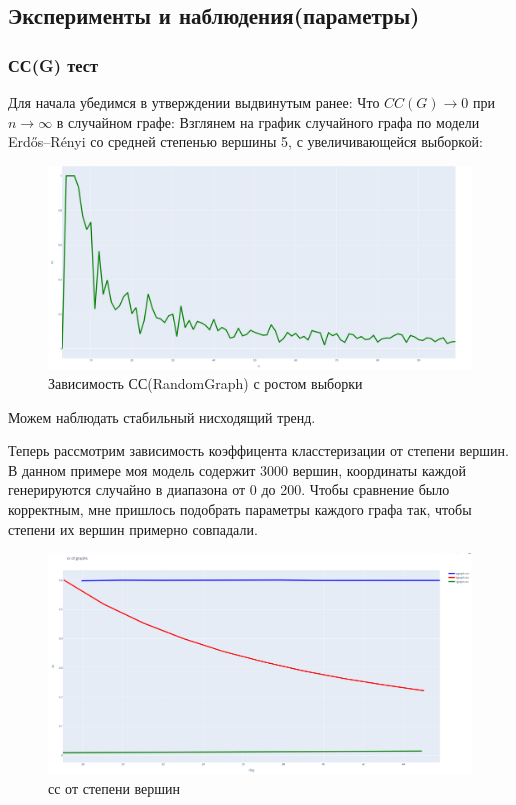 \subsection{Эксперименты и наблюдения(параметры)}

\subsubsection{СС(G) тест}

Для начала убедимся в утверждении выдвинутым ранее: Что $CC(G) \rightarrow 0$ при $n \rightarrow \infty$ в случайном графе:
Взглянем на график случайного графа по модели Erdős–Rényi со средней степенью вершины 5,
с увеличивающейся выборкой:


\begin{figure}[H]
    \centering
    \includegraphics[scale=0.25]{./pictures/random_cc_long_period.png}
    \caption{Зависимость СС(RandomGraph) с ростом выборки} \label{сс от степени вершин}
\end{figure}
Можем наблюдать стабильный нисходящий тренд.

Теперь рассмотрим зависимость коэффицента класстеризации от степени вершин.
В данном примере моя модель содержит 3000 вершин, координаты каждой генерируются случайно 
в диапазона от 0 до 200. Чтобы сравнение было корректным, мне пришлось подобрать параметры
каждого графа так, чтобы степени их вершин примерно совпадали.

\begin{figure}[H]
    \centering
    \includegraphics[scale=0.25]{./pictures/cc_better.png}
    \caption{сс от степени вершин} \label{сс}
\end{figure}

